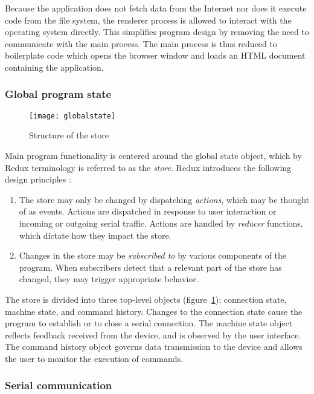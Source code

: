 Because the application does not fetch data from the Internet nor does it
execute code from the file system, the renderer process is allowed to interact
with the operating system directly. This simplifies program design by removing
the need to communicate with the main process. The main process is thus reduced
to boilerplate code which opens the browser window and loads an HTML document
containing the application.

\subsubsection{Global program state}

\begin{figure}[ht]
    \begin{center}
        \texttt{[image: globalstate]}
        \caption{Structure of the store}
        \label{store}
    \end{center}
\end{figure}

Main program functionality is centered around the global state object, which
by Redux terminology is referred to as the \textit{store}. Redux introduces the
following design principles \cite{redux}:
\begin{enumerate}
    \item The store may only be changed by dispatching \textit{actions}, which
    may be thought of as events. Actions are dispatched in response to user
    interaction or incoming or outgoing serial traffic. Actions are handled
    by \textit{reducer} functions, which dictate how they impact the store.
    \item Changes in the store may be \textit{subscribed to} by various
    components of the program. When subscribers detect that a relevant part
    of the store has changed, they may trigger appropriate behavior.
\end{enumerate}

The store is divided into three top-level objects (figure~\ref{store}):
connection state, machine state, and command history. Changes to the connection
state cause the program to establish or to close a serial connection. The
machine state object reflects feedback received from the device, and is observed
by the user interface. The command history object governs data transmission
to the device and allows the user to monitor the execution of commands.

\subsubsection{Serial communication}

